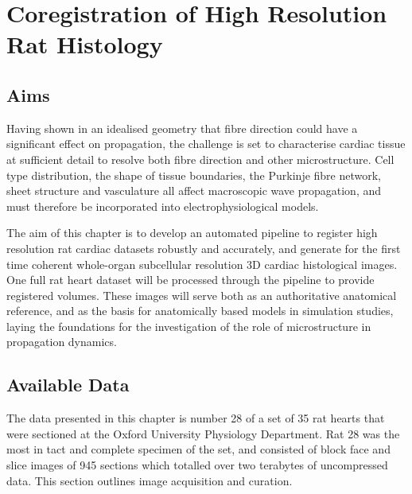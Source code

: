 \chapter{Coregistration of High Resolution Rat Histology} %
\label{cha:coregistration_of_high_resolution_rat_histology}
\dblspace
\begin{quote}{\em }\end{quote}

\section{Aims} %
\label{sec:aims}
  Having shown in an idealised geometry that fibre direction could have a significant effect on propagation, the challenge is set to characterise cardiac tissue at sufficient detail to resolve both fibre direction and other microstructure. Cell type distribution, the shape of tissue boundaries, the Purkinje fibre network, sheet structure and vasculature all affect macroscopic wave propagation, and must therefore be incorporated into electrophysiological models.
	
  The aim of this chapter is to develop an automated pipeline to register high resolution rat cardiac datasets robustly and accurately, and generate for the first time coherent whole-organ subcellular resolution 3D cardiac histological images. One full rat heart dataset will be processed through the pipeline to provide registered volumes. These images will serve both as an authoritative anatomical reference, and as the basis for anatomically based models in simulation studies, laying the foundations for the investigation of the role of microstructure in propagation dynamics.

\section{Available Data} %
\label{sec:available_data}
  The data presented in this chapter is number 28 of a set of 35 rat hearts that were sectioned at the Oxford University Physiology Department. Rat 28 was the most in tact and complete specimen of the set, and consisted of block face and slice images of 945 sections which totalled over two terabytes of uncompressed data. This section outlines image acquisition and curation.
  

